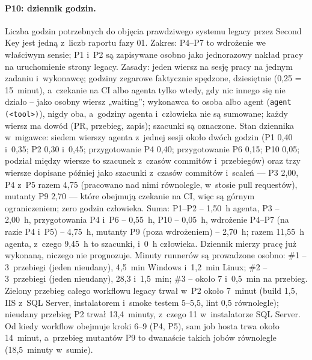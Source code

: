 \paragraph{P10: dziennik godzin.} Liczba godzin potrzebnych do objęcia prawdziwego systemu
legacy przez Second Key jest jedną z~liczb raportu fazy 01. Zakres: P4--P7 to wdrożenie
we właściwym sensie; P1 i~P2 są zapisywane osobno jako jednorazowy nakład pracy na uruchomienie strony
legacy. Zasady: jeden wiersz na sesję pracy na jednym zadaniu i~wykonawcę; godziny zegarowe
faktycznie spędzone, dziesiętnie (0,25 = 15~minut), a~czekanie na CI albo agenta tylko wtedy,
gdy nic innego się nie działo -- jako osobny wiersz „waiting”; wykonawca to osoba albo
agent (\texttt{agent (<tool>)}), nigdy oba, a~godziny agenta i~człowieka nie są
sumowane; każdy wiersz ma dowód (PR, przebieg, zapis); szacunki są oznaczone. Stan
dziennika w~migawce: siedem wierszy agenta z~jednej sesji około dwóch godzin (P1 0,40 i~0,35;
P2 0,30 i~0,45; przygotowanie P4 0,40; przygotowanie P6 0,15; P10 0,05; podział między
wiersze to szacunek z~czasów commitów i~przebiegów) oraz trzy wiersze dopisane później jako
szacunki z~czasów commitów i~scaleń --- P3 2,00, P4 z~P5 razem 4,75 (pracowano nad nimi
równolegle, w~stosie pull requestów), mutanty P9 2,70 --- które obejmują czekanie na CI,
więc są górnym ograniczeniem; zero godzin człowieka. Suma: P1--P2 -- 1,50~h agenta, P3 --
2,00~h, przygotowania P4 i~P6 -- 0,55~h, P10 -- 0,05~h, wdrożenie P4--P7 (na razie P4
i~P5) -- 4,75~h, mutanty P9 (poza wdrożeniem) -- 2,70~h; razem 11,55~h agenta, z~czego 9,45~h
to szacunki, i~0~h człowieka. Dziennik mierzy pracę już wykonaną, niczego nie prognozuje.
Minuty runnerów są prowadzone osobno: \#1 -- 3~przebiegi (jeden nieudany), 4,5~min
Windows i~1,2~min Linux; \#2 -- 3~przebiegi (jeden nieudany), 28,3 i~1,5~min; \#3 -- około
7 i~0,5~min na przebieg. Zielony przebieg całego workflowu legacy trwał w~P2 około
7~minut (build 1,5, IIS z~SQL Server, instalatorem i~smoke testem 5--5,5, lint 0,5
równolegle); nieudany przebieg P2 trwał 13,4~minuty, z~czego 11 w~instalatorze SQL Server.
Od kiedy workflow obejmuje kroki 6--9 (P4, P5), sam job hosta trwa około 14~minut,
a~przebieg mutantów P9 to dwanaście takich jobów równolegle (18,5~minuty w~sumie).


